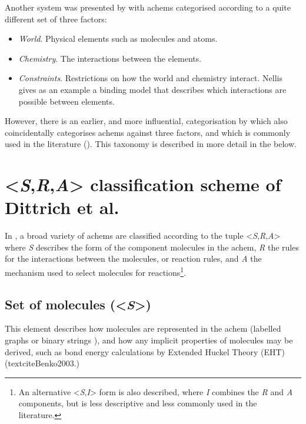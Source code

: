 Another system was presented by \textcite[p.132]{Nellis2012} with \glspl{achem} categorised according to a quite different set of three factors:
\begin{itemize}
	\item \emph{World}. Physical elements such as molecules and atoms.
	\item \emph{Chemistry}. The interactions between the elements.
	\item \emph{Constraints}. Restrictions on how the world and chemistry interact. Nellis gives as an example a binding model that describes which interactions are possible between elements.
\end{itemize}

However, there is an earlier, and more influential, categorisation by \textcite{Dittrich:2001zr} which also coincidentally categorises \glspl{achem} against three factors, and which is commonly used in the literature (\eg \textcite{Lenaerts2009,Gardiner2007}). This taxonomy is described in more detail in the  below.

\section{\textless{}\emph{S},\emph{R},\emph{A}\textgreater{} classification scheme of Dittrich et al.}\label{dittrich}

In \textcite{Dittrich:2001zr}, a broad variety of \glspl{achem} are classified according to the tuple \textless{}\emph{S},\emph{R},\emph{A}\textgreater{} where \emph{S} describes the form of the component molecules in the \gls{achem}, \emph{R} the rules for the interactions between the molecules, or reaction rules, and \emph{A} the mechanism used to select molecules for reactions\footnote{An alternative \textless{}\emph{S},\emph{I}\textgreater{} form is also described, where \emph{I} combines the \emph{R} and \emph{A} components, but is less descriptive and less commonly used in the literature.}. 

\subsection{Set of molecules (\textless{}\emph{S}\textgreater{})}

This element describes how molecules are represented in the \gls{achem} (\eg labelled graphs \parencite{Faulconbridge2011} or binary strings \parencite{Banzhaf94}), and how any implicit properties of molecules may be derived, such as bond energy calculations by Extended Huckel Theory (EHT) (\eg textcite{Benko2003}.)

